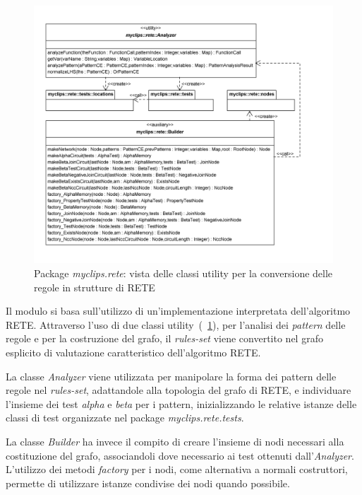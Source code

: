 \begin{figure}
\centering
\includegraphics[width=1\textwidth]{Immagini/Capitolo3/Classi/myclips_rete_Builders.png}
\caption{Package \emph{myclips.rete}: vista delle classi utility per la conversione delle regole in strutture di RETE}\label{fig:class-myclips-rete-builders}
\end{figure}

Il modulo si basa sull'utilizzo di un'implementazione interpretata dell'algoritmo RETE. Attraverso l'uso di due classi utility~(\figurename~\ref{fig:class-myclips-rete-builders}), per l'analisi dei \emph{pattern} delle regole e per la costruzione del grafo, il \emph{rules-set} viene convertito nel grafo esplicito di valutazione caratteristico dell'algoritmo RETE.

La classe \emph{Analyzer} viene utilizzata per manipolare la forma dei pattern delle regole nel \emph{rules-set}, adattandole alla topologia del grafo di RETE, e individuare l'insieme dei test \emph{alpha} e \emph{beta} per i pattern, inizializzando le relative istanze delle classi di test organizzate nel package \emph{myclips.rete.tests}.

La classe \emph{Builder} ha invece il compito di creare l'insieme di nodi necessari alla costituzione del grafo, associandoli dove necessario ai test ottenuti dall'\emph{Analyzer}.
L'utilizzo dei metodi \emph{factory} per i nodi, come alternativa a normali costruttori, permette di utilizzare istanze condivise dei nodi quando possibile.

